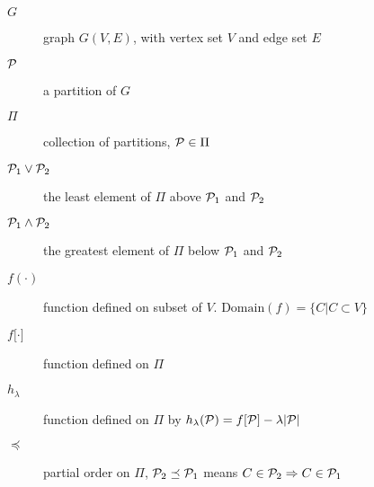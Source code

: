 \begin{description}
\item[$G$] graph $G(V,E)$, with vertex set $V$ and edge set $E$
\item[$\P$] a partition of $G$
\item[$\Pi$] collection of partitions, $\P \in \Pi$
\item[$\P_1 \vee \P_2$] the least element of $\Pi$ above $\P_1$ and $\P_2$
\item[$\P_1 \wedge \P_2$] the greatest element of $\Pi$ below $\P_1$ and $\P_2$
\item[$f(\cdot)$] function defined on subset of $V$. $\mathrm{Domain}(f)=\{C| C\subset V\}$
\item[$f{[}\cdot{]}$] function defined on $\Pi$
\item[$h_{\lambda}$] function defined on $\Pi$ by $h_{\lambda}(\P)=f[\P]-\lambda\abs{\P}$
\item[$\preceq$] partial order on $\Pi$, $\P_2 \preceq \P_1$ means $C\in \P_2 \Rightarrow C \in \P_1$
\end{description}
